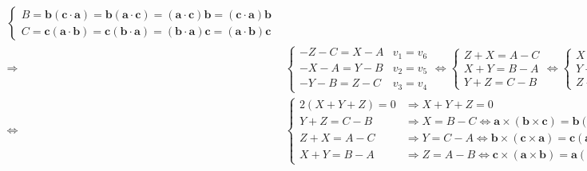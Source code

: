 \documentclass[
]{book}
\theoremstyle{definition}
\theoremstyle{definition}
\theoremstyle{definition}
\theoremstyle{definition}
\theoremstyle{remark}
\begin{document}
\[\begin{aligned}
\begin{cases}
B=\boldsymbol{b}\left(\boldsymbol{c}\cdot\boldsymbol{a}\right)=\boldsymbol{b}\left(\boldsymbol{a}\cdot\boldsymbol{c}\right)=\left(\boldsymbol{a}\cdot\boldsymbol{c}\right)\boldsymbol{b}=\left(\boldsymbol{c}\cdot\boldsymbol{a}\right)\boldsymbol{b}\\
C=\boldsymbol{c}\left(\boldsymbol{a}\cdot\boldsymbol{b}\right)=\boldsymbol{c}\left(\boldsymbol{b}\cdot\boldsymbol{a}\right)=\left(\boldsymbol{b}\cdot\boldsymbol{a}\right)\boldsymbol{c}=\left(\boldsymbol{a}\cdot\boldsymbol{b}\right)\boldsymbol{c}
\end{cases}\\
\Rightarrow & \begin{cases}
-Z-C=X-A & v_{{\scriptscriptstyle 1}}=v_{{\scriptscriptstyle 6}}\\
-X-A=Y-B & v_{{\scriptscriptstyle 2}}=v_{{\scriptscriptstyle 5}}\\
-Y-B=Z-C & v_{{\scriptscriptstyle 3}}=v_{{\scriptscriptstyle 4}}
\end{cases}\Leftrightarrow\begin{cases}
Z+X=A-C\\
X+Y=B-A\\
Y+Z=C-B
\end{cases}\Leftrightarrow\begin{cases}
X+Y=B-A\\
Y+Z=C-B\\
Z+X=A-C
\end{cases}\\
\Leftrightarrow & \begin{cases}
2\left(X+Y+Z\right)=0 & \Rightarrow X+Y+Z=0\\
Y+Z=C-B & \Rightarrow X=B-C\Leftrightarrow\boldsymbol{a}\times\left(\boldsymbol{b}\times\boldsymbol{c}\right)=\boldsymbol{b}\left(\boldsymbol{c}\cdot\boldsymbol{a}\right)-\boldsymbol{c}\left(\boldsymbol{a}\cdot\boldsymbol{b}\right)\text{ "back cab"}\\
Z+X=A-C & \Rightarrow Y=C-A\Leftrightarrow\boldsymbol{b}\times\left(\boldsymbol{c}\times\boldsymbol{a}\right)=\boldsymbol{c}\left(\boldsymbol{a}\cdot\boldsymbol{b}\right)-\boldsymbol{a}\left(\boldsymbol{b}\cdot\boldsymbol{c}\right)\\
X+Y=B-A & \Rightarrow Z=A-B\Leftrightarrow\boldsymbol{c}\times\left(\boldsymbol{a}\times\boldsymbol{b}\right)=\boldsymbol{a}\left(\boldsymbol{b}\cdot\boldsymbol{c}\right)-\boldsymbol{b}\left(\boldsymbol{c}\cdot\boldsymbol{a}\right)
\end{cases}
\end{aligned}
\]
\end{document}
